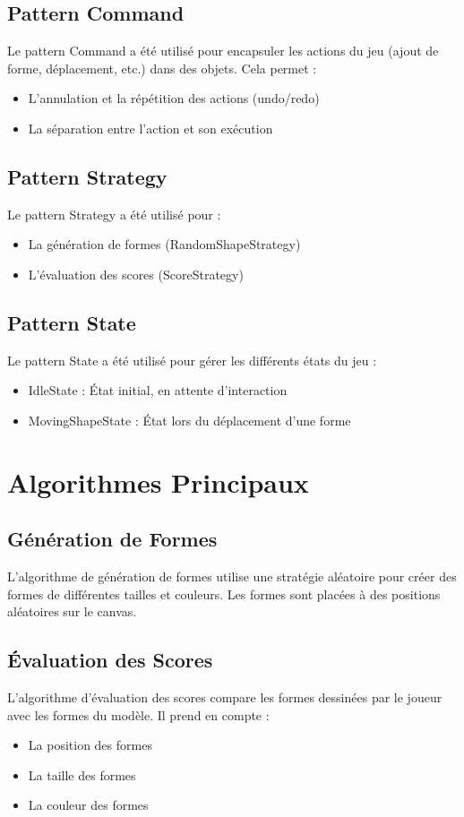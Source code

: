 \documentclass[11pt,a4paper]{article}
\begin{document}
\subsection{Pattern Command}
Le pattern Command a été utilisé pour encapsuler les actions du jeu (ajout de forme, déplacement, etc.) dans des objets. Cela permet :
\begin{itemize}
    \item L'annulation et la répétition des actions (undo/redo)
    \item La séparation entre l'action et son exécution
\end{itemize}

\subsection{Pattern Strategy}
Le pattern Strategy a été utilisé pour :
\begin{itemize}
    \item La génération de formes (RandomShapeStrategy)
    \item L'évaluation des scores (ScoreStrategy)
\end{itemize}

\subsection{Pattern State}
Le pattern State a été utilisé pour gérer les différents états du jeu :
\begin{itemize}
    \item IdleState : État initial, en attente d'interaction
    \item MovingShapeState : État lors du déplacement d'une forme
\end{itemize}

\section{Algorithmes Principaux}

\subsection{Génération de Formes}
L'algorithme de génération de formes utilise une stratégie aléatoire pour créer des formes de différentes tailles et couleurs. Les formes sont placées à des positions aléatoires sur le canvas.

\subsection{Évaluation des Scores}
L'algorithme d'évaluation des scores compare les formes dessinées par le joueur avec les formes du modèle. Il prend en compte :
\begin{itemize}
    \item La position des formes
    \item La taille des formes
    \item La couleur des formes
\end{itemize}
\end{document}
